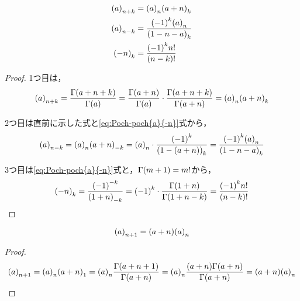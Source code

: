 \documentclass[a4paper,draft]{ltjsarticle}
\begin{document}
\begin{prop}\label{prop:poch-(a)_{n+k}}
    \begin{align}
        \poch{a}{n+k}&=\poch{a}{n}\poch{a+n}{k}
        \\
        \poch{a}{n-k}&=\dfrac{\pare{-1}^k\poch{a}{n}}{\poch{1-n-a}{k}}
        \\
        \poch{-n}{k}&=\dfrac{\pare{-1}^k n!}{\pare{n-k}!} \label{eq:Poch-poch(-n)_{-k}}
    \end{align}
    \begin{proof}
        1つ目は，
        \begin{equation}
            \poch{a}{n+k}=\Poch{a}{n+k}=\Poch{a}{n}\cdot\Poch{a+n}{k}=\poch{a}{n}\poch{a+n}{k}
        \end{equation}

        2つ目は直前に示した式と\eqref{eq:Poch-poch{a}{-n}}式から，
        \begin{equation}
            \poch{a}{n-k}=\poch{a}{n}\poch{a+n}{-k}=\poch{a}{n}\cdot\frac{\pare{-1}^k}{\poch{1-\spare{a+n}}{k}}=\dfrac{\pare{-1}^k\poch{a}{n}}{\poch{1-n-a}{k}}
        \end{equation}

        3つ目は\eqref{eq:Poch-poch{a}{-n}}式と，$\fun{\Gamma}{m+1}=m!$から，
        \begin{equation}
            \poch{-n}{k}=\frac{\pare{-1}^{-k}}{\poch{1+n}{-k}}=\pare{-1}^k\cdot \frac{\fun{\Gamma}{1+n}}{\fun{\Gamma}{1+n-k}}=\dfrac{\pare{-1}^k n!}{\pare{n-k}!}
        \end{equation}
    \end{proof}
\end{prop}

\begin{cor}\label{cor:poch-(a)_{n+1}}
    \begin{equation}
        \poch{a}{n+1}=\pare{a+n}\poch{a}{n}
    \end{equation}
    \begin{proof}
        \begin{equation}
            \poch{a}{n+1}=\poch{a}{n}\poch{a+n}{1}=\poch{a}{n}\Poch{a+n}{1}
            =\poch{a}{n}\frac{\pare{a+n}\fun{\Gamma}{a+n}}{\fun{\Gamma}{a+n}}=\pare{a+n}\poch{a}{n}
        \end{equation}
    \end{proof}
\end{cor}
\end{document}

